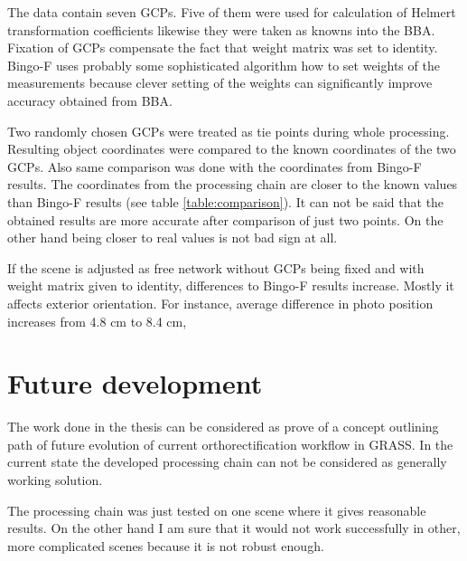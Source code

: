 \documentclass[a4paper,12pt]{article}
\begin{document}
The data contain seven GCPs. Five of them were used for calculation of  Helmert transformation coefficients
likewise they were taken as knowns into the BBA. 
Fixation of GCPs compensate the fact that weight matrix was set to identity. 
Bingo-F uses probably some sophisticated algorithm how to set weights of the measurements because 
clever setting of the weights can significantly improve accuracy obtained from BBA.

Two randomly chosen GCPs were treated as tie points during whole processing. 
Resulting object coordinates were compared to the known coordinates of the two GCPs.
Also same comparison was done with the coordinates from Bingo-F results. 
The coordinates from the processing chain are closer to the known values 
than Bingo-F results (see table \ref{table:comparison}). 
It can not be said that the obtained results 
are more accurate after comparison of just two points. On the other 
hand being closer to real values is  not bad sign at all.
 
If the scene is adjusted as free network without GCPs being fixed and with 
weight matrix given to identity, differences to Bingo-F results increase. 
Mostly it affects exterior orientation.
For instance, average difference in photo position increases from 4.8 cm to 8.4 cm, 


\section{Future development}

The work done in the thesis can be considered as prove of a concept
outlining path of future evolution of current orthorectification workflow in GRASS. 
In the current state the developed 
processing chain can not be considered as generally working solution.

The processing chain was just tested 
 on one scene where it gives reasonable results. On the other hand 
I am sure that it would not work successfully in other, more complicated scenes because 
it is not robust enough.
\end{document}
